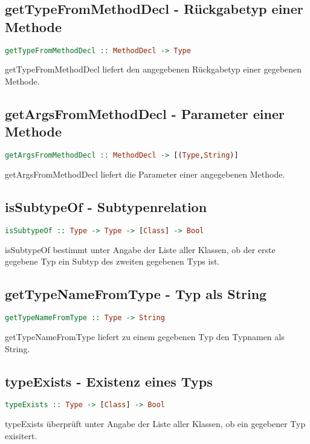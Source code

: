 \documentclass[a4paper,10pt]{article}
\begin{document}
\subsection{getTypeFromMethodDecl - Rückgabetyp einer Methode}
\begin{lstlisting}[language=Haskell]
getTypeFromMethodDecl :: MethodDecl -> Type
\end{lstlisting}
getTypeFromMethodDecl liefert den angegebenen Rückgabetyp einer gegebenen Methode.
\\
\newpage
\subsection{getArgsFromMethodDecl - Parameter einer Methode}
\begin{lstlisting}[language=Haskell]
getArgsFromMethodDecl :: MethodDecl -> [(Type,String)]
\end{lstlisting}
getArgsFromMethodDecl liefert die Parameter einer angegebenen Methode.
\\
\subsection{isSubtypeOf - Subtypenrelation}
\begin{lstlisting}[language=Haskell]
isSubtypeOf :: Type -> Type -> [Class] -> Bool
\end{lstlisting}
isSubtypeOf bestimmt unter Angabe der Liste aller Klassen, ob der erste gegebene Typ ein Subtyp des zweiten gegebenen Typs ist.
\\
\subsection{getTypeNameFromType - Typ als String}
\begin{lstlisting}[language=Haskell]
getTypeNameFromType :: Type -> String
\end{lstlisting}
getTypeNameFromType liefert zu einem gegebenen Typ den Typnamen als String.
\\
\subsection{typeExists - Existenz eines Typs}
\begin{lstlisting}[language=Haskell]
typeExists :: Type -> [Class] -> Bool
\end{lstlisting}
typeExists überprüft unter Angabe der Liste aller Klassen, ob ein gegebener Typ exisitert.
\end{document}
